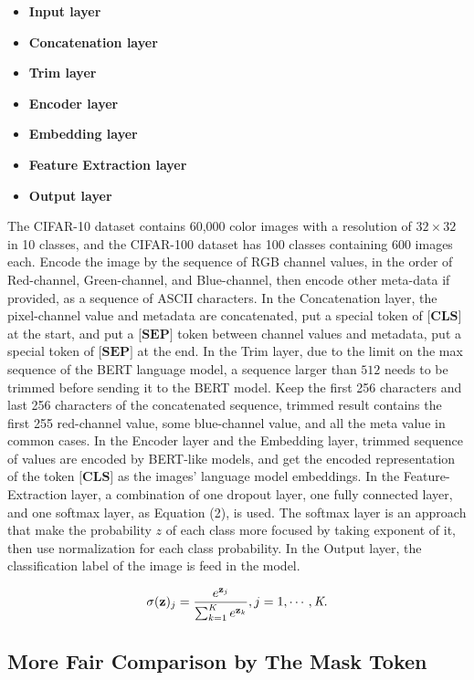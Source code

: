 \documentclass[runningheads]{llncs}
\begin{document}
\begin{itemize}
\item {\bf Input layer}
\item {\bf Concatenation layer}
\item {\bf Trim layer}
\item {\bf Encoder layer}
\item {\bf Embedding layer}
\item {\bf Feature Extraction layer}
\item {\bf Output layer}
\end{itemize}


\par The CIFAR-10 dataset contains 60,000 color images with a resolution of $32\times32$ in 10 classes, and the CIFAR-100 dataset has 100 classes containing 600 images each.
Encode the image by the sequence of RGB channel values, in the order of Red-channel, Green-channel, and Blue-channel,
then encode other meta-data if provided, as a sequence of ASCII characters.
In the Concatenation layer, the pixel-channel value and metadata are concatenated, put a special token of $\textbf{[CLS]}$ at the start,
and put a $\textbf{[SEP]}$ token between channel values and metadata, put a special token of $\textbf{[SEP]}$ at the end.
In the Trim layer, due to the limit on the max sequence of the BERT language model, a sequence larger than $512$ needs to be trimmed before sending it to the BERT model.
Keep the first 256 characters and last 256 characters of the concatenated sequence, trimmed result contains the first 255 red-channel value,
some blue-channel value, and all the meta value in common cases.
In the Encoder layer and the Embedding layer, trimmed sequence of values are encoded by BERT-like models,
and get the encoded representation of the token $\textbf{[CLS]}$ as the images' language model embeddings.
In the Feature-Extraction layer, a combination of one dropout layer, one fully connected layer, and one softmax layer, as Equation (2), is used.
The softmax layer is an approach that make the probability $z$ of each class more focused by taking exponent of it, then use normalization for each class probability.
In the Output layer, the classification label of the image is feed in the model.

\begin{equation}
  \sigma(\textbf{z})_j = {e^{\textbf{z}_j} \over {\sum_{k=1}^{\textit{K}} e^{\textbf{z}_k}}}, j=1,\cdots,\textit{K}.
\end{equation}

\subsection{More Fair Comparison by The Mask Token}
\end{document}
